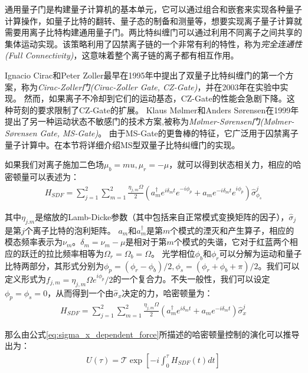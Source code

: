 通用量子门是构建量子计算机的基本单元，它可以通过组合和嵌套来实现各种量子计算操作，如量子比特的翻转、量子态的制备和测量等，想要实现离子量子计算就需要用离子比特构建通用量子门。两比特纠缠门可以通过利用不同离子之间共享的集体运动实现。该策略利用了囚禁离子链的一个非常有利的特性，称为\emph{完全连通性(Full Connectivity)}，这意味着整个离子链的离子都有相互作用。

Ignacio Cirac和Peter Zoller最早在1995年中提出了双量子比特纠缠门的第一个方案\cite[]{Cirac_Zoller_2002}，称为\emph{Cirac-Zoller门(Cirac-Zoller Gate, CZ-Gate)}，并在2003年在实验中实现\cite[]{Schmidt_Kaler_Häffner_Riebe_Gulde_Lancaster_Deuschle_Becher_Roos_Eschner_Blatt_2003}。
然而，如果离子不冷却到它们的运动基态，CZ-Gate的性能会急剧下降。这种苛刻的要求限制了CZ-Gate的扩展。
Klaus Mølmer和Anders Sørensen在1999年提出了另一种运动状态不敏感门的技术方案\cite[]{Sørensen_Mølmer_2002},被称为\emph{Mølmer-Sørensen门(Mølmer-Sørensen Gate, MS-Gate)}。
由于MS-Gate的更鲁棒的特征，它广泛用于囚禁离子量子计算中。在本节将详细介绍MS型双量子比特纠缠门的实现。

如果我们对离子施加二色场$\mu_b=mu, \mu_r=-\mu$，就可以得到状态相关力，相应的哈密顿量可以表述为：
\begin{align}
    H_{SDF}=\sum_{j=1}^{2}\sum_{m=1}^{2}\frac{\eta_{j,m}\Omega}{2}\left(a_m^\dagger e^{i\delta_m t}e^{-i\phi_p}+a_m e^{-i\delta_m t}e^{i\phi_p}\right)\hat{\sigma}_{\phi_s}^j
\end{align}

其中$\eta_{j.m}$是缩放的Lamb-Dicke参数（其中包括来自正常模式变换矩阵的因子）\cite[]{James_1998}，$\hat{\sigma}_j$是第$j$个离子比特的泡利矩阵。
$a_m$和$a_m^\dagger$是第$m$个模式的湮灭和产生算子，相应的模态频率表示为$\nu_m$。$\delta_m=\nu_m-\mu$是相对于第$m$个模式的失谐，它对于红蓝两个相应的跃迁的拉比频率相等为$\Omega_r=\Omega_b=\Omega$。
光学相位$\phi_b$和$\phi_r$可以分解为运动和量子比特两部分，其形式分别为$\phi_p=(\phi_r-\phi_b)/2, \phi_s=(\phi_r+\phi_b+\pi)/2$。我们可以定义形式为$f_{j,m}=\eta_{j,m}\Omega e^{i\phi_p}/2$的一个复合力。不失一般性，我们可以设定$\phi_p=\phi_s=0$，从而得到一个由$\hat{\sigma}_x$决定的力，哈密顿量为：
\begin{align}
    H_{SDF}=\sum_{j=1}^{2}\sum_{m=1}^{2}\frac{\eta_{j, m}\Omega}{2}\left(a_m^\dagger e^{i\delta_mt}+a_m e^{-i\delta_mt}\right)\hat{\sigma}_x^j\label{eq:sigma_x_dependent_force}
\end{align}

那么由公式\eqref{eq:sigma_x_dependent_force}所描述的哈密顿量控制的演化可以推导出为：
\begin{align}
    U(\tau)=\mathscr{T}\exp\left[-i\int_{0}^{\tau}H_{SDF}(t)dt\right]\label{eq:unitary_evolution_operator}
\end{align}

